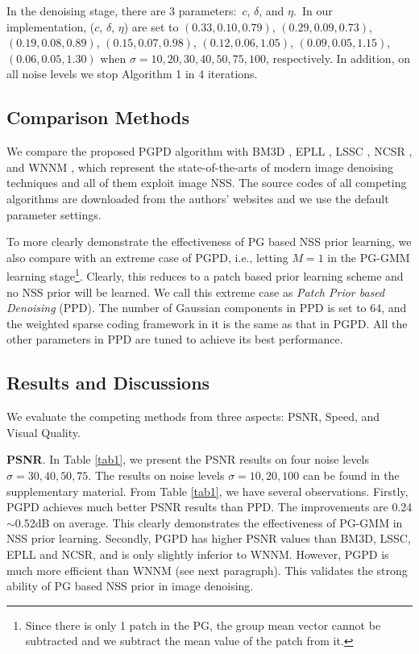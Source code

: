 In the denoising stage, there are 3 parameters:\ $c$, $\delta$, and $\eta$.\ In our implementation, ($c$, $\delta$, $\eta$) are set to $(0.33,0.10,0.79)$, $(0.29,0.09,0.73)$, $(0.19,0.08,0.89)$, $(0.15,0.07,0.98)$, $(0.12,0.06,1.05)$, $(0.09,0.05,1.15)$, $(0.06,0.05,1.30)$ when $\sigma=10,20,30,40,50,75,100$, respectively. In addition, on all noise levels we stop Algorithm 1 in 4 iterations.
\vspace{-0.05in}
\subsection{Comparison Methods}
We compare the proposed PGPD algorithm with BM3D \cite{bm3d}, EPLL \cite{epll}, LSSC \cite{lssc}, NCSR \cite{ncsr}, and WNNM \cite{wnnm}, which represent the state-of-the-arts of modern image denoising techniques and all of them exploit image NSS. The source codes of all competing algorithms are downloaded from the authors' websites and we use the default parameter settings.  

To more clearly demonstrate the effectiveness of PG based NSS prior learning, we also compare with an extreme case of PGPD, i.e., letting $M=1$ in the PG-GMM learning stage\footnote{Since there is only 1 patch in the PG, the group mean vector cannot be subtracted and we subtract the mean value of the patch from it.}. Clearly, this reduces to a patch based prior learning scheme and no NSS prior will be learned. We call this extreme case as \textsl{Patch Prior based Denoising} (PPD).  The number of Gaussian components in PPD is set to 64, and the weighted sparse coding framework in it is the same as that in PGPD. All the other parameters in PPD are tuned to achieve its best performance.
\vspace{-0.05in}
\subsection{Results and Discussions}
We evaluate the competing methods from three aspects: PSNR, Speed, and Visual Quality.

\textbf{PSNR}. In Table \ref{tab1}, we present the PSNR results on four noise levels $\sigma=30,40,50,75$. The results on noise levels $\sigma=10,20,100$ can be found in the supplementary material. From Table \ref{tab1}, we have several observations. Firstly, PGPD achieves much better PSNR results than PPD. The improvements are 0.24$\sim$0.52dB on average. This clearly demonstrates the effectiveness of PG-GMM in NSS prior learning. Secondly, PGPD has higher PSNR values than BM3D, LSSC, EPLL and NCSR, and is only slightly inferior to WNNM. However, PGPD is much more efficient than WNNM (see next paragraph). This validates the strong ability of PG based NSS prior in image denoising. 

